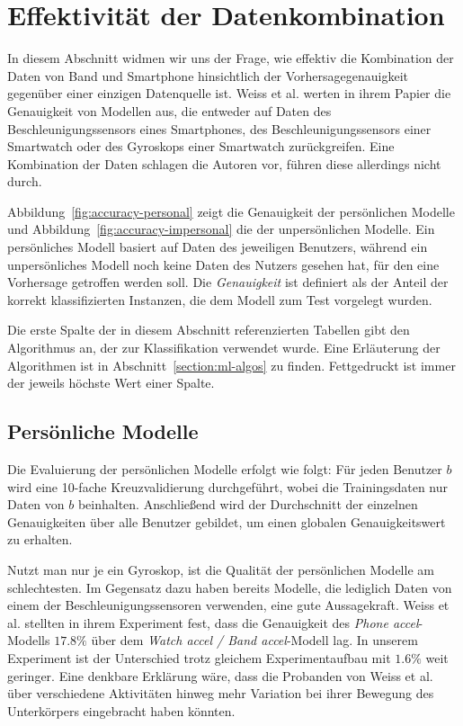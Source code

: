 
\section{Effektivität der Datenkombination}
In diesem Abschnitt widmen wir uns der Frage, wie effektiv die Kombination der Daten von Band und Smartphone hinsichtlich der Vorhersagegenauigkeit gegenüber einer einzigen Datenquelle ist. Weiss et al.\cite{Weiss2016} werten in ihrem Papier die Genauigkeit von Modellen aus, die entweder auf Daten des Beschleunigungssensors eines Smartphones, des Beschleunigungssensors einer Smartwatch oder des Gyroskops einer Smartwatch zurückgreifen. Eine Kombination der Daten schlagen die Autoren vor, führen diese allerdings nicht durch.

Abbildung~\ref{fig:accuracy-personal} zeigt die Genauigkeit der persönlichen Modelle und Abbildung~\ref{fig:accuracy-impersonal} die der unpersönlichen Modelle. Ein persönliches Modell basiert auf Daten des jeweiligen Benutzers, während ein unpersönliches Modell noch keine Daten des Nutzers gesehen hat, für den eine Vorhersage getroffen werden soll. Die \textit{Genauigkeit} ist definiert als der Anteil der korrekt klassifizierten Instanzen, die dem Modell zum Test vorgelegt wurden.

Die erste Spalte der in diesem Abschnitt referenzierten Tabellen gibt den Algorithmus an, der zur Klassifikation verwendet wurde. Eine Erläuterung der Algorithmen ist in Abschnitt~\ref{section:ml-algos}
zu finden. Fettgedruckt ist immer der jeweils höchste Wert einer Spalte.

\subsection{Persönliche Modelle}

Die Evaluierung der persönlichen Modelle erfolgt wie folgt: Für jeden Benutzer $b$ wird eine 10-fache Kreuzvalidierung durchgeführt, wobei die Trainingsdaten nur Daten von $b$ beinhalten. Anschließend wird der Durchschnitt der einzelnen Genauigkeiten über alle Benutzer gebildet, um einen globalen Genauigkeitswert zu erhalten.

Nutzt man nur je ein Gyroskop, ist die Qualität der persönlichen Modelle am schlechtesten. Im Gegensatz dazu haben bereits Modelle, die lediglich Daten von einem der Beschleunigungssensoren verwenden, eine gute Aussagekraft. Weiss et al.\cite{Weiss2016} stellten in ihrem Experiment fest, dass die Genauigkeit des \textit{Phone accel}-Modells $17.8 \%$ über dem \textit{Watch accel / Band accel}-Modell lag. In unserem Experiment ist der Unterschied trotz gleichem Experimentaufbau mit $1.6 \%$ weit geringer. Eine denkbare Erklärung wäre, dass die Probanden von Weiss et al. über verschiedene Aktivitäten hinweg mehr Variation bei ihrer Bewegung des Unterkörpers eingebracht haben könnten.

